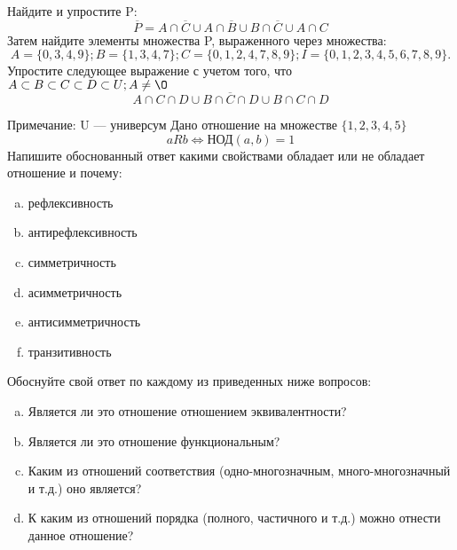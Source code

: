 \documentclass[10pt]{exam}
\begin{document}
\begin{questions}
\question
Найдите и упростите P:
\begin{equation*}
\overline{P} = A \cap \overline{C} \cup A \cap \overline{B} \cup B \cap \overline{C} \cup A \cap C
\end{equation*}
Затем найдите элементы множества P, выраженного через множества:
\begin{equation*}
A = \{0, 3, 4, 9\}; 
B = \{1, 3, 4, 7\};
C = \{0, 1, 2, 4, 7, 8, 9\};
I = \{0, 1, 2, 3, 4, 5, 6, 7, 8, 9\}.
\end{equation*}\question
Упростите следующее выражение с учетом того, что $A\subset B \subset C \subset D \subset U; A \neq \O$
\begin{equation*}
A \cap C  \cap D \cup B \cap \overline{C} \cap D \cup B \cap C \cap D
\end{equation*}

Примечание: U — универсум\question
Дано отношение на множестве $\{1, 2, 3, 4, 5\}$ 
\begin{equation*}
aRb \iff  \text{НОД}(a,b) =1
\end{equation*}
Напишите обоснованный ответ какими свойствами обладает или не обладает отношение и почему:   
\begin{enumerate} [a)]\setcounter{enumi}{0}
\item рефлексивность
\item антирефлексивность
\item симметричность
\item асимметричность
\item антисимметричность
\item транзитивность
\end{enumerate}

Обоснуйте свой ответ по каждому из приведенных ниже вопросов:
\begin{enumerate} [a)]\setcounter{enumi}{0}
    \item Является ли это отношение отношением эквивалентности?
    \item Является ли это отношение функциональным?
    \item Каким из отношений соответствия (одно-многозначным, много-многозначный и т.д.) оно является?
    \item К каким из отношений порядка (полного, частичного и т.д.) можно отнести данное отношение?
\end{enumerate}



\end{questions}
\end{document}
